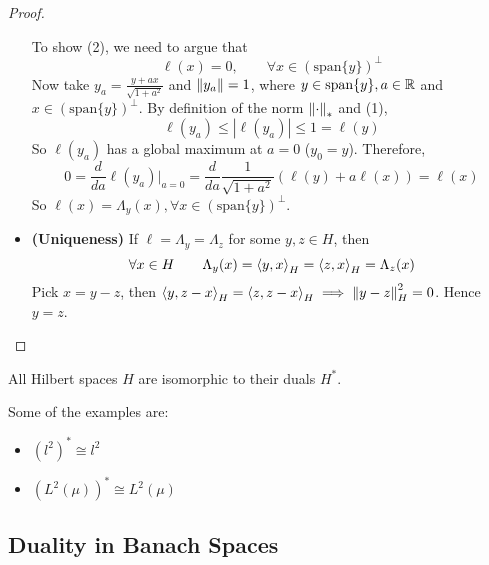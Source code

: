\documentclass{article}
\begin{document}
\begin{proof}
\begin{itemize}
        To show (2), we need to argue that 
        \begin{equation*}
            \ell(x)=0, \qquad \forall x \in (\textrm{span}\{y\})^{\perp}
        \end{equation*}  
        Now take  \(y_a = \frac{y+ax}{\sqrt{1+a^2}}\) and  \(\left\|{y_a}\right\|=1\), where  \(y \in \textrm{span}\{y\}, a\in \mathbb{R}\) and  \(x \in (\textrm{span}\{y\})^{\perp}\). By definition of the norm  \(\left\|{\cdot}\right\|_*\) and (1),  
        \begin{equation*}
            \ell(y_a)  \leq |\ell(y_a)| \leq 1 = \ell(y)
        \end{equation*}  
        So  \(\ell(y_a)\) has a global maximum at  \(a=0\)  (\(y_0=y\)). Therefore,  
        \begin{equation*}
            0 = \frac{d}{da} \ell(y_a) \Bigr|_{a=0} = \frac{d}{da} \frac{1}{\sqrt{1+a^2}} (\ell(y)+a\ell(x))=\ell(x)
        \end{equation*}  
        So  \(\ell(x)=\Lambda_y(x), \forall x \in (\textrm{span}\{y\})^{\perp}\).
        
        \item \textbf{(Uniqueness)}  
        If  \(\ell=\Lambda_y=\Lambda_z\) for some  \(y,z \in H\), then  
        \[
        \forall x \in H \qquad \Lambda_y(x) = \left<{y},{x}\right>_H = \left<{z},{x}\right>_H = \Lambda_z(x)
        \]  
        Pick  \(x=y-z\), then  \(\left<{y},{z-x}\right>_H = \left<{z},{z-x}\right>_H \implies \left\|{y-z}\right\|_H^2=0\). Hence  \(y=z\).
    \end{itemize}
\end{proof}

\begin{corollary}
    All Hilbert spaces  \(H\) are isomorphic to their duals  \(H^*\).
\end{corollary}  

\begin{unexaminable}
\begin{example}
    Some of the examples are:  
    \begin{itemize}
        \item  \((l^2)^* \cong l^2\)
        \item  \((L^2(\mu))^* \cong L^2(\mu)\)
    \end{itemize}
\end{example}
\end{unexaminable}

\subsection{Duality in Banach Spaces}  
\end{document}

